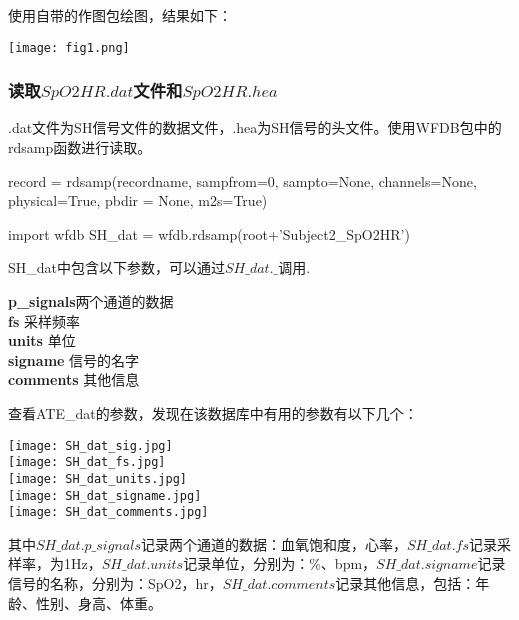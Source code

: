 \documentclass[UTF8]{ctexart}
\begin{document}
使用自带的作图包绘图，结果如下：
\begin{center} 
\texttt{[image: fig1.png]}\\
\end{center}
\subsubsection{读取$SpO2HR.dat$文件和$SpO2HR.hea$}
.dat文件为SH信号文件的数据文件，.hea为SH信号的头文件。使用WFDB包中的rdsamp函数进行读取。
\begin{thm}
record = rdsamp(recordname, sampfrom=0, sampto=None, channels=None,
physical=True, pbdir = None, m2s=True)
\end{thm}
\begin{python}
import wfdb
SH\_dat = wfdb.rdsamp(root+'Subject2_SpO2HR')
\end{python}
SH\_dat中包含以下参数，可以通过$SH\_dat.\_$调用.
\begin{tabbing}
\textbf{p\_signals}\quad\quad\quad\quad\quad\quad\= 两个通道的数据\\[5pt]
\textbf{fs}											\> 采样频率\\[5pt]
\textbf{units}											\> 单位\\[5pt]
\textbf{signame}										\> 信号的名字\\[5pt]
\textbf{comments}											\> 其他信息\\
\end{tabbing}
查看ATE\_dat的参数，发现在该数据库中有用的参数有以下几个：
\begin{center} 
\texttt{[image: SH\_dat\_sig.jpg]}\\
\vspace{3mm}
\texttt{[image: SH\_dat\_fs.jpg]}\\
\vspace{3mm}
\texttt{[image: SH\_dat\_units.jpg]}\\
\vspace{3mm}
\texttt{[image: SH\_dat\_signame.jpg]}\\
\vspace{3mm}
\texttt{[image: SH\_dat\_comments.jpg]}\\ 
\end{center}
其中$SH\_dat.p\_signals$记录两个通道的数据：血氧饱和度，心率，$SH\_dat.fs$记录采样率，为1Hz，$SH\_dat.units$记录单位，分别为：\%、bpm，$SH\_dat.signame$记录信号的名称，分别为：SpO2，hr，$SH\_dat.comments$记录其他信息，包括：年龄、性别、身高、体重。
\end{document}
